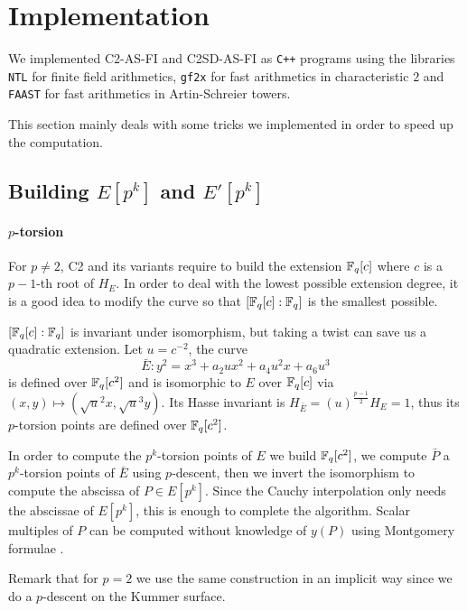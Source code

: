 \section{Implementation}
\label{sec:implementation}

We implemented C2-AS-FI and C2SD-AS-FI as \texttt{C++} programs using
the libraries \texttt{NTL} for finite field arithmetics, \texttt{gf2x}
for fast arithmetics in characteristic $2$ and \texttt{FAAST} for fast
arithmetics in Artin-Schreier towers.

This section mainly deals with some tricks we implemented in order to
speed up the computation.

\subsection{Building $E[p^k]$ and $E'[p^k]$}
\label{sec:impl:torsion}

\paragraph{$p$-torsion}
For $p\ne2$, C2 and its variants require to build the extension
$\mathbb{F}_q[c]$ where $c$ is a $p-1$-th root of $H_E$. In order to deal with
the lowest possible extension degree, it is a good idea to modify the
curve so that $[\mathbb{F}_q[c]:\mathbb{F}_q]$ is the smallest possible.

$[\mathbb{F}_q[c]:\mathbb{F}_q]$ is invariant under isomorphism, but taking a twist
can save us a quadratic extension. Let $u=c^{-2}$, the curve
\begin{equation*}
  \bar{E} : y^2 = x^3 + a_2ux^2 + a_4u^2x + a_6u^3
\end{equation*}
is defined over $\mathbb{F}_q[c^2]$ and is isomorphic to $E$ over $\mathbb{F}_q[c]$
via $(x,y)\mapsto(\sqrt{u}^2x,\sqrt{u}^3y)$. Its Hasse invariant is
$H_{\bar{E}} = (u)^{\frac{p-1}{2}}H_E = 1$, thus its $p$-torsion
points are defined over $\mathbb{F}_q[c^2]$.

In order to compute the $p^k$-torsion points of $E$ we build
$\mathbb{F}_q[c^2]$, we compute $\bar{P}$ a $p^k$-torsion points of $\bar{E}$
using $p$-descent, then we invert the isomorphism to compute the
abscissa of $P\in E[p^k]$. Since the Cauchy interpolation only needs
the abscissae of $E[p^k]$, this is enough to complete the
algorithm. Scalar multiples of $P$ can be computed without knowledge
of $y(P)$ using Montgomery formulae \cite{Mon87}.

Remark that for $p=2$ we use the same construction in an implicit way
since we do a $p$-descent on the Kummer surface.


